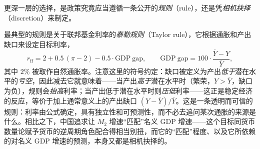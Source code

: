 更深一层的选择，是政策究竟应当遵循一条公开的\emph{规则}（rule），还是凭\emph{相机抉择}（discretion）来制定。


最典型的规则是关于联邦基金利率的\emph{泰勒规则}（Taylor rule），它根据通胀和产出缺口来设定目标利率，
\[
r_{\mathrm{ff}} = 2 + 0.5\,(\pi - 2) - 0.5\cdot \mathrm{GDP\ gap}, \qquad
\mathrm{GDP\ gap} = 100\cdot\frac{\overline{Y}-Y}{\overline{Y}},
\]
其中 $2\%$ 被取作自然通胀率。注意这里的符号约定：缺口被定义为产出\emph{低于}潜在水平的\emph{亏空}，因此减去它就意味着——当产出\emph{高于}潜在水平时（繁荣，$Y>\overline{Y}$，缺口为负），规则会\emph{抬高}利率；当产出低于潜在水平时则\emph{压低}利率——这正是稳定经济的反应，等价于加上通常意义上的产出缺口 $(Y-\overline{Y})/\overline{Y}$。这是一条透明而可信的规则：利率由公式确定，具有独立性和可预测性，而不必去追问某次通胀的来源是什么。相比之下，中国追求让 $M_2$ 增速``匹配''名义 GDP 增速——这个目标同货币数量论赋予货币的逆周期角色配合得相当别扭，而它的``匹配''程度、以及它所依赖的对名义 GDP 增速的预测，本身又都是相机抉择的。

